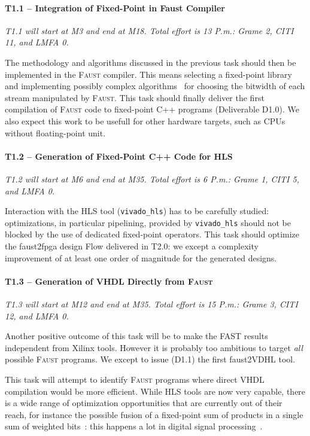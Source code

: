 \documentclass[a4paper,9pt]{extarticle}
\newcommand{\F}{\textsc{Faust}}
\newcommand{\PP}{FAST}
\begin{document}
\paragraph{T1.1 -- Integration of Fixed-Point in Faust Compiler}

\textit{T1.1 will start at M3 and end at M18. Total effort is 13 P.m.: Grame 2, CITI 11, and LMFA 0.}

The methodology and algorithms discussed in the previous task should then be implemented in the \F{} compiler. This means selecting a fixed-point library and implementing possibly complex algorithms~\cite{volkova:hal-01561052} for choosing the bitwidth of each stream manipulated by \F{}. This task should finally deliver the first compilation of \F{} code to fixed-point C++ programs (Deliverable D1.0). We also expect this work to be usefull for other hardware targets, such as CPUs without floating-point unit.

\paragraph{T1.2 -- Generation of Fixed-Point C++ Code for HLS}

\textit{T1.2 will start at M6 and end at M35. Total effort is 6 P.m.: Grame 1, CITI 5, and LMFA 0.}

Interaction with the HLS tool ({\tt vivado\_hls}) has to be carefully studied: optimizations, in particular pipelining, provided by {\tt vivado\_hls} should not be blocked by the use of dedicated fixed-point operators. This task should optimize the faust2fpga design Flow delivered in T2.0: we except a complexity improvement of at least one order of magnitude for the generated designs.

\paragraph{T1.3 -- Generation of VHDL Directly from \F{}}

\textit{T1.3 will start at M12 and end at M35. Total effort is 15 P.m.: Grame 3, CITI 12, and LMFA 0.}

Another positive outcome of this task will be to make the  \PP{} results independent from Xilinx tools. However it is probably too ambitious to target {\em all} possible \F{} programs. We except to issue (D1.1) the first faust2VDHL tool.

This task will attempt to identify \F{} programs where direct VHDL compilation would be more efficient. While HLS tools are now very capable, there is a wide range of optimization opportunities that are currently out of their reach, for instance the possible fusion of a fixed-point sum of products in a single sum of weighted bits~\cite{fs97,DinIstSer2013-FPL-BitHeap}: this happens a lot in digital signal processing~\cite{volkova:hal-01561052}. 
\end{document}
